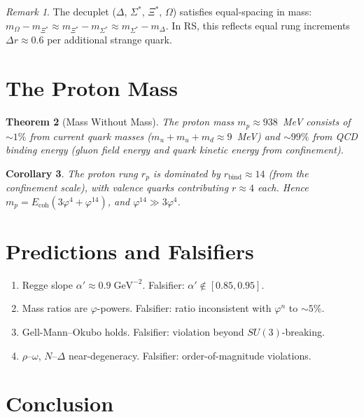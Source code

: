 \documentclass[12pt,a4paper]{article}
\newtheorem{theorem}{Theorem}[section]
\newtheorem{corollary}[theorem]{Corollary}
\theoremstyle{definition}
\theoremstyle{remark}
\newtheorem{remark}[theorem]{Remark}
\begin{document}
\begin{remark}
The decuplet ($\Delta$, $\Sigma^*$, $\Xi^*$, $\Omega$) satisfies
equal-spacing in mass: $m_{\Omega} - m_{\Xi^*} \approx m_{\Xi^*} -
m_{\Sigma^*} \approx m_{\Sigma^*} - m_{\Delta}$.  In RS, this reflects
equal rung increments $\Delta r \approx 0.6$ per additional strange
quark.
\end{remark}

\section{The Proton Mass}\label{sec:proton}

\begin{theorem}[Mass Without Mass]
\label{thm:masswithoutmass}
The proton mass $m_p \approx 938$~MeV consists of $\sim 1\%$ from
current quark masses ($m_u + m_u + m_d \approx 9$~MeV) and $\sim 99\%$
from QCD binding energy (gluon field energy and quark kinetic energy
from confinement).
\end{theorem}

\begin{corollary}
The proton rung $r_p$ is dominated by $r_{\mathrm{bind}} \approx 14$
(from the confinement scale), with valence quarks contributing
$r \approx 4$ each.  Hence $m_p = E_{\mathrm{coh}}(3\varphi^4 +
\varphi^{14})$, and $\varphi^{14} \gg 3\varphi^4$.
\end{corollary}

\section{Predictions and Falsifiers}\label{sec:falsifiers}

\begin{enumerate}[label=(\roman*)]
\item Regge slope $\alpha' \approx 0.9\;\mathrm{GeV}^{-2}$.  Falsifier:
  $\alpha' \notin [0.85, 0.95]$.
\item Mass ratios are $\varphi$-powers.  Falsifier: ratio inconsistent
  with $\varphi^n$ to $\sim 5\%$.
\item Gell-Mann--Okubo holds.  Falsifier: violation beyond $SU(3)$-breaking.
\item $\rho$--$\omega$, $N$--$\Delta$ near-degeneracy.  Falsifier:
  order-of-magnitude violations.
\end{enumerate}

\section{Conclusion}\label{sec:conclusion}
\end{document}
